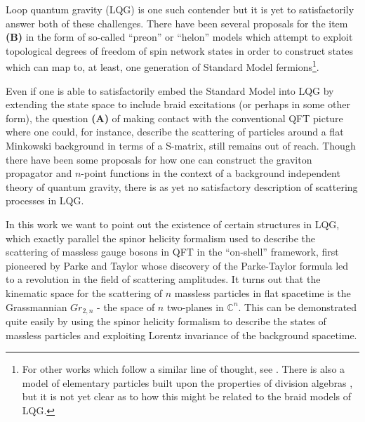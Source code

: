 \documentclass[twocolumn,final,aps,nofootinbib,nobibnotes]{revtex4-2}
\newcommand{\C}{\mathbb{C}}
\begin{document}
Loop quantum gravity (LQG) is one such contender but it is yet to satisfactorily answer both of these challenges. There have been several proposals for the item \textbf{(B)} in the form of so-called ``preon'' or ``helon'' models \cite{Bilson-Thompson2005A-topological,Bilson-Thompson2006Quantum,Wan2007On-Braid,Smolin2007Propagation,Bilson-Thompson2008Particle,Wan2009Effective,Vaid2010Embedding} which attempt to exploit topological degrees of freedom of spin network states in order to construct states which can map to, at least, one generation of Standard Model fermions\footnote{For other works which follow a similar line of thought, see \cite{Gresnigt2017Quantum,Asselmeyer-Maluga2019Braids}. There is also a model of elementary particles built upon the properties of division algebras \cite{Furey2010Unified,Furey2014Generations:,Furey2016Standard}, but it is not yet clear as to how this might be related to the braid models of LQG.}.

Even if one is able to satisfactorily embed the Standard Model into LQG by extending the state space to include braid excitations (or perhaps in some other form), the question \textbf{(A)} of making contact with the conventional QFT picture where one could, for instance, describe the scattering of particles around a flat Minkowski background in terms of a S-matrix, still remains out of reach. Though there have been some proposals for how one can construct the graviton propagator \cite{Rovelli2005Graviton} and $ n $-point functions \cite{Modesto2005Particle} in the context of a background independent theory of quantum gravity, there is as yet no satisfactory description of scattering processes in LQG.

In this work we want to point out the existence of certain structures in LQG, which exactly parallel the spinor helicity formalism used to describe the scattering of massless gauge bosons in QFT in the ``on-shell'' framework, first pioneered by Parke and Taylor \cite{Parke1986Amplitude} whose discovery of the Parke-Taylor formula led to a revolution in the field of scattering amplitudes. It turns out that the kinematic space for the scattering of $ n $ massless particles in flat spacetime is the Grassmannian $ Gr_{2,n} $ - the space of $ n $ two-planes in $ \C^n $. This can be demonstrated quite easily by using the spinor helicity formalism to describe the states of massless particles and exploiting Lorentz invariance of the background spacetime.
\end{document}
